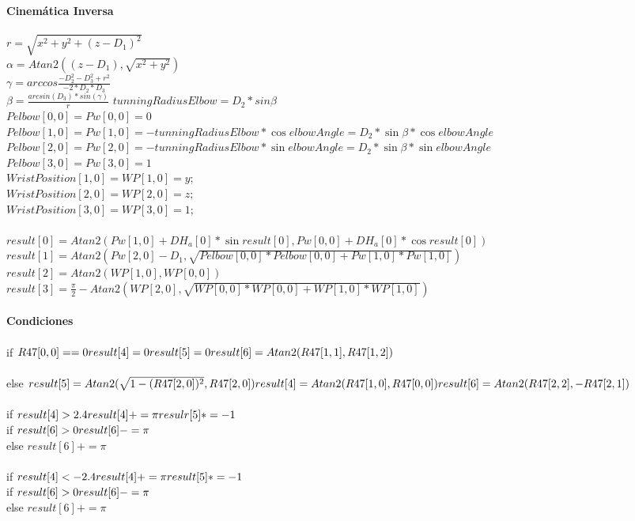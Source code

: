 \documentclass[user_manual.tex]{subfiles}
\begin{document}
\textbf{Cinemática Inversa}\\
\\
$r=\sqrt{x^2+y^2+(z-D_1)^2}$\\
$\alpha=Atan2((z-D_1),\sqrt{x^2+y^2})$\\
$\gamma=arccos\frac{-D_2^2-D_3^2+r^2}{-2*D_2*D_3}$\\
$\beta=\frac{arcsin(D_3)*sin(\gamma)}{r}$
$tunningRadiusElbow=D_2*sin\beta$\\
$Pelbow[0,0]=Pw[0,0]=0$\\
$Pelbow[1,0]=Pw[1,0]=-tunningRadiusElbow*\cos elbowAngle=D_2*\sin\beta*\cos elbowAngle$\\
$Pelbow[2,0]=Pw[2,0]=-tunningRadiusElbow*\sin elbowAngle=D_2 *\sin\beta*\sin elbowAngle$\\
$Pelbow[3,0]=Pw[3,0]=1$\\
$WristPosition[1,0]=WP[1,0]=y;$\\
$WristPosition[2,0]=WP[2,0]=z;$\\
$WristPosition[3,0]=WP[3,0]=1;$\\
\\
$result[0]=Atan2(Pw[1,0]+DH_a[0]*\sin result[0],Pw[0,0]+DH_a[0]*\cos result[0])$\\
$result[1]=Atan2(Pw[2,0]-D_1,\sqrt{Pelbow[0,0]*Pelbow[0,0]+Pw[1,0]*Pw[1,0]})$\\
$result[2]=Atan2(WP[1,0],WP[0,0])$\\
$result[3]=\frac{\pi}{2}-Atan2(WP[2,0],\sqrt{WP[0,0]*WP[0,0]+WP[1,0]*WP[1,0]})$\\
\\
\textbf{Condiciones}\\
\\
if $R47[0,0]==0\\
result[4]=0\\
result[5]=0\\
result[6]=Atan2(R47[1,1],R47[1,2])$\\
\\
else
$result[5]=Atan2(\sqrt{1-(R47[2,0])^2},R47[2,0])\\
result[4]=Atan2(R47[1,0],R47[0,0])\\
result[6]=Atan2(R47[2,2],-R47[2,1])$\\
\\
if $result[4]>2.4\\
result[4]+=\pi\\
resulr[5]*=-1$\\
if $result[6]>0\\
result[6]-=\pi$\\
else $result[6]+=\pi$\\
\\
if $result[4]<-2.4\\
result[4]+=\pi\\
result[5]*=-1$\\
if $result[6]>0\\
result[6]-=\pi$\\
else $result[6]+=\pi$\\
\end{document}
